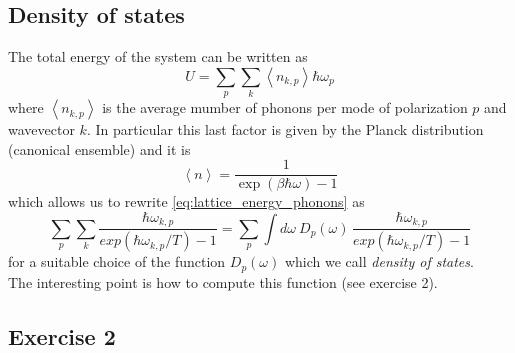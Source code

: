 \subsection*{Density of states}
The total energy of the system can be written as
\begin{equation}
    U = \sum_{p}\sum_{k} \left\langle n_{k,p} \right\rangle \hbar \omega_p
    \label{eq:lattice_energy_phonons}
\end{equation}
where $\left\langle n_{k,p} \right\rangle$ is the average mumber of phonons per mode of polarization $p$ and wavevector $k$. In particular this last factor
is given by the Planck distribution (canonical ensemble) and it is 
$$\left\langle n \right\rangle = \frac{1}{\exp(\beta\hbar\omega) - 1}$$
which allows us to rewrite \ref{eq:lattice_energy_phonons} as 
\begin{equation*}
    \sum_p \sum_k \frac{\hbar \omega_{k,p}}{exp(\hbar\omega_{k,p}/T) - 1} = \sum_p \int d\omega \ D_p(\omega) \, \frac{\hbar \omega_{k,p}}{exp(\hbar\omega_{k,p}/T) - 1}
\end{equation*}
for a suitable choice of the function $D_p(\omega)$ which we call \emph{density of states}. \\
The interesting point is how to compute this function (see exercise 2).

\subsection*{Exercise 2}
